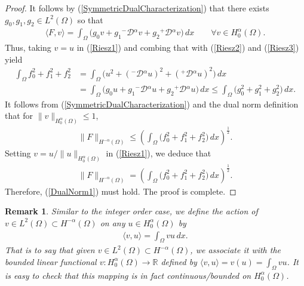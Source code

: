 \documentclass[leqno,final]{siamltex}
\numberwithin{equation}{section}
\newtheorem{remark}{Remark}[section]
\renewcommand{\(}{\bigl(}
\renewcommand{\)}{\bigr)}
\newcommand{\R}{\mathbb{R}}
\begin{document}
\begin{proof}
   It follows by (\ref{SymmetricDualCharacterization}) that there exists $g_0 , g_1 , g_2 \in L^{2}(\Omega)$ so that 
   \begin{align}\label{Riesz3}
       \langle F , v \rangle = \int_{\Omega}  \bigl(g_0 v + g_1 {^{-}}{\mathcal{D}}{^{\alpha}} v + g_2 {^{+}}{\mathcal{D}}{^{\alpha}} v \bigr)\, dx \qquad\forall v \in H^{\alpha}_{0}(\Omega).
   \end{align}
   Thus, taking $v = u$ in (\ref{Riesz1}) and combing that with (\ref{Riesz2}) and (\ref{Riesz3})
   yield 
   \begin{align*}
       \int_{\Omega} f_0^2 + f_1^2 + f_2^2 &= \int_{\Omega} \bigl(u^2 + ({^{-}}{\mathcal{D}}{^{\alpha}} u)^{2} + ( {^{+}}{\mathcal{D}}{^{\alpha}} u)^{2}\bigr)\,dx \\
       &= \int_{\Omega} \bigl( g_0 u + g_1 {^{-}}{\mathcal{D}}{^{\alpha}} u + g_2 {^{+}}{\mathcal{D}}{^{\alpha}} u \bigr) \, dx 
       \leq \int_{\Omega} \bigl( g_0^2 + g_1 ^2 + g_2^2\bigr)\, dx.
   \end{align*}
   It follows from (\ref{SymmetricDualCharacterization}) and the dual norm definition that for $\|v\|_{H^{\alpha}_{0}(\Omega)} \leq 1$, 
   \begin{align*}
       \|F\|_{H^{-\alpha}(\Omega)} \leq \left(\int_{\Omega} \bigl(f_0^2 + f_1^2 + f_2^2 \bigr)\, dx \right)^{\frac12}.
   \end{align*}
   Setting $v = u/\|u\|_{H^{\alpha}_{0}(\Omega)}$ in (\ref{Riesz1}), we deduce that 
   \begin{align*}
       \|F\|_{H^{-\alpha}(\Omega)} = \left( \int_{\Omega}  \bigl(f_0^2 + f_1^2 + f_2^2 \bigr)\, dx \right)^{\frac12}.
   \end{align*}
   Therefore, (\ref{DualNorm1}) must hold. The proof is complete.
   \end{proof}
   
   \begin{remark}
   Similar to the integer order case, we define the action of $v \in L^{2}(\Omega) \subset H^{-\alpha}(\Omega)$ on any $u \in H^{\alpha}_{0}(\Omega)$ by
    \begin{align}
        \langle v,u \rangle = \int_{\Omega} vu\,dx.
    \end{align}
    That is to say that given $v \in L^{2}(\Omega) \subset H^{-\alpha}(\Omega)$, we associate it with the bounded linear functional $v: H^{\alpha}_{0}(\Omega) \rightarrow \R$ defined by $\langle v , u \rangle = v(u) = \int_{\Omega} vu$. It is easy to check that this mapping is in fact continuous/bounded on $H^{\alpha}_{0}(\Omega)$. 
   \end{remark}
   
\end{document}
